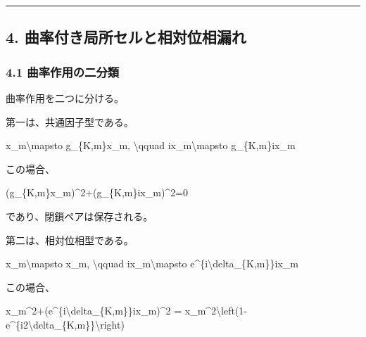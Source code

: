 \documentclass[
  a4paper,
]{article}
\newenvironment{Shaded}{}{}
\newcommand{\NormalTok}[1]{#1}
\begin{document}
\begin{center}\rule{0.5\linewidth}{0.5pt}\end{center}

\subsection{4.
曲率付き局所セルと相対位相漏れ}\label{ux66f2ux7387ux4ed8ux304dux5c40ux6240ux30bbux30ebux3068ux76f8ux5bfeux4f4dux76f8ux6f0fux308c}

\subsubsection{4.1
曲率作用の二分類}\label{ux66f2ux7387ux4f5cux7528ux306eux4e8cux5206ux985e}

曲率作用を二つに分ける。

第一は、共通因子型である。

\begin{Shaded}
\begin{Highlighting}[]
\NormalTok{x\_m\textbackslash{}mapsto g\_\{K,m\}x\_m,}
\NormalTok{\textbackslash{}qquad}
\NormalTok{ix\_m\textbackslash{}mapsto g\_\{K,m\}ix\_m}
\end{Highlighting}
\end{Shaded}

この場合、

\begin{Shaded}
\begin{Highlighting}[]
\NormalTok{(g\_\{K,m\}x\_m)\^{}2+(g\_\{K,m\}ix\_m)\^{}2=0}
\end{Highlighting}
\end{Shaded}

であり、閉鎖ペアは保存される。

第二は、相対位相型である。

\begin{Shaded}
\begin{Highlighting}[]
\NormalTok{x\_m\textbackslash{}mapsto x\_m,}
\NormalTok{\textbackslash{}qquad}
\NormalTok{ix\_m\textbackslash{}mapsto e\^{}\{i\textbackslash{}delta\_\{K,m\}\}ix\_m}
\end{Highlighting}
\end{Shaded}

この場合、

\begin{Shaded}
\begin{Highlighting}[]
\NormalTok{x\_m\^{}2+(e\^{}\{i\textbackslash{}delta\_\{K,m\}\}ix\_m)\^{}2}
\NormalTok{=}
\NormalTok{x\_m\^{}2\textbackslash{}left(1{-}e\^{}\{i2\textbackslash{}delta\_\{K,m\}\}\textbackslash{}right)}
\end{Highlighting}
\end{Shaded}
\end{document}
